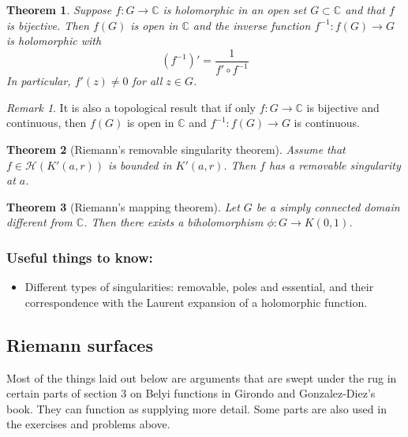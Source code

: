 \documentclass[reqno]{amsart}
\newtheorem{theorem}{Theorem}[section]
\theoremstyle{definition}
\theoremstyle{remark}
\newtheorem*{remark}{Remark}
\begin{document}
\begin{theorem}
    Suppose $f \colon G \to \mathbb{C}$ is
    holomorphic in an open set
    $G \subset \mathbb{C}$ and that
    $f$ is bijective. Then
    $f(G)$ is open in $\mathbb{C}$ and
    the inverse function
    $f^{-1} \colon f(G) \to G$ is
    holomorphic with
    \[
    (f^{-1})' = \frac{1}{f' \circ
    f^{-1}}
    \]
    In particular,
    $f'(z) \neq 0$ for all
    $z \in G$.
\end{theorem}

\begin{remark}
    It is also a topological result that
    if only $f \colon G \to \mathbb{C}$
    is bijective and continuous, then
    $f(G)$ is open in $\mathbb{C}$ and
    $f^{-1} \colon f(G) \to G$ is
    continuous.
\end{remark}

\begin{theorem}[Riemann's removable singularity theorem]\label{removable-singularity-thb}
    Assume that $f \in \mathcal{H}
    (K'(a,r))$ is bounded in
    $K'(a,r)$. Then $f$ has a removable
    singularity at $a$.
\end{theorem}

\begin{theorem}[Riemann's mapping theorem]\label{Riemann-mapping-thm}
    Let $G$ be a simply connected domain different
    from $\mathbb{C}$. Then there exists a 
    biholomorphism $\phi \colon G \to K(0,1)$.
\end{theorem}



\subsubsection{Useful things to know:}
\begin{itemize}
    \item Different types of singularities:
    removable, poles and essential, and their correspondence with the Laurent
    expansion of a holomorphic function.
\end{itemize}


\subsection{Riemann surfaces}
\begin{center}
    Most of the things laid out below are arguments that are swept under the rug in certain parts
of section 3 on Belyi functions in Girondo and Gonzalez-Diez's book. They can function as
supplying more detail. Some parts are also used
in the exercises and problems above.
\end{center}
\end{document}
